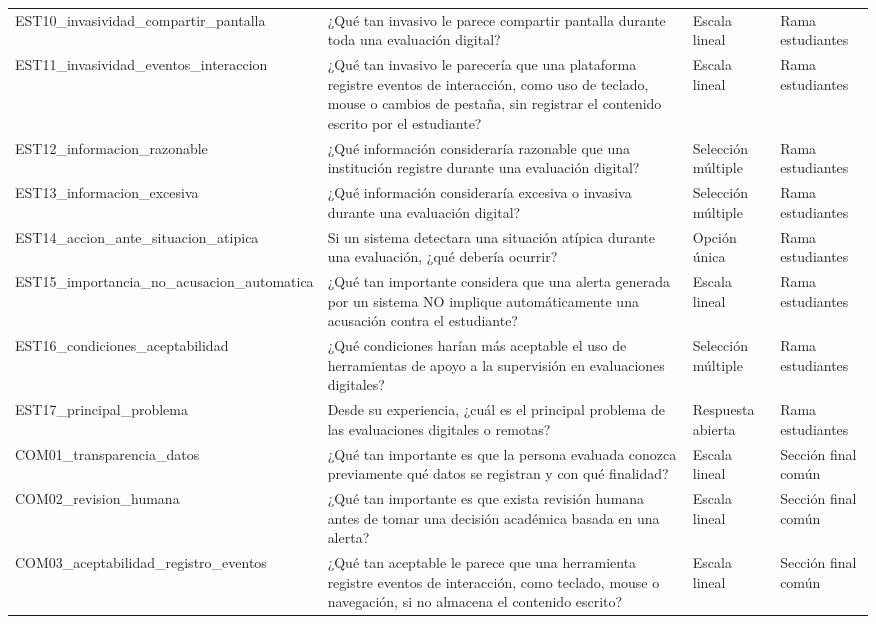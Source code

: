 \begin{center}
\begin{longtable}{@{}p{3.4cm}p{3.7cm}p{3.7cm}p{3.7cm}@{}}
EST10\_\allowbreak invasividad\_\allowbreak compartir\_\allowbreak pantalla & ¿Qué tan invasivo le parece compartir pantalla durante toda una evaluación digital? & Escala lineal & Rama estudiantes \\
EST11\_\allowbreak invasividad\_\allowbreak eventos\_\allowbreak interaccion & ¿Qué tan invasivo le parecería que una plataforma registre eventos de interacción, como uso de teclado, mouse o cambios de pestaña, sin registrar el contenido escrito por el estudiante? & Escala lineal & Rama estudiantes \\
EST12\_\allowbreak informacion\_\allowbreak razonable & ¿Qué información consideraría razonable que una institución registre durante una evaluación digital? & Selección múltiple & Rama estudiantes \\
EST13\_\allowbreak informacion\_\allowbreak excesiva & ¿Qué información consideraría excesiva o invasiva durante una evaluación digital? & Selección múltiple & Rama estudiantes \\
EST14\_\allowbreak accion\_\allowbreak ante\_\allowbreak situacion\_\allowbreak atipica & Si un sistema detectara una situación atípica durante una evaluación, ¿qué debería ocurrir? & Opción única & Rama estudiantes \\
EST15\_\allowbreak importancia\_\allowbreak no\_\allowbreak acusacion\_\allowbreak automatica & ¿Qué tan importante considera que una alerta generada por un sistema NO implique automáticamente una acusación contra el estudiante? & Escala lineal & Rama estudiantes \\
EST16\_\allowbreak condiciones\_\allowbreak aceptabilidad & ¿Qué condiciones harían más aceptable el uso de herramientas de apoyo a la supervisión en evaluaciones digitales? & Selección múltiple & Rama estudiantes \\
EST17\_\allowbreak principal\_\allowbreak problema & Desde su experiencia, ¿cuál es el principal problema de las evaluaciones digitales o remotas? & Respuesta abierta & Rama estudiantes \\
COM01\_\allowbreak transparencia\_\allowbreak datos & ¿Qué tan importante es que la persona evaluada conozca previamente qué datos se registran y con qué finalidad? & Escala lineal & Sección final común \\
COM02\_\allowbreak revision\_\allowbreak humana & ¿Qué tan importante es que exista revisión humana antes de tomar una decisión académica basada en una alerta? & Escala lineal & Sección final común \\
COM03\_\allowbreak aceptabilidad\_\allowbreak registro\_\allowbreak eventos & ¿Qué tan aceptable le parece que una herramienta registre eventos de interacción, como teclado, mouse o navegación, si no almacena el contenido escrito? & Escala lineal & Sección final común \\

\end{longtable}
\end{center}
